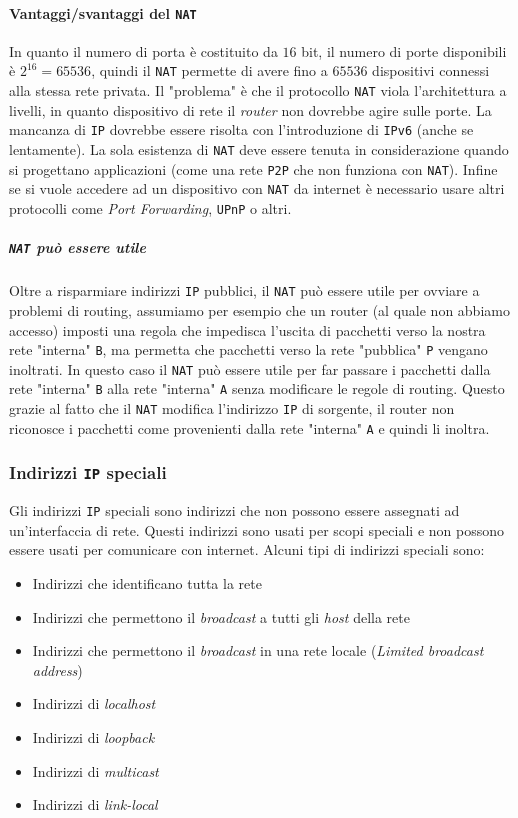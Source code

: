             \paragraph{Vantaggi/svantaggi del \texttt{NAT}} In quanto il numero di porta è costituito da $16$ bit, il numero di porte disponibili è $2^{16}=65536$, quindi il \texttt{NAT} permette di avere fino a $65536$ dispositivi connessi alla stessa rete privata. Il "problema" è che il protocollo \texttt{NAT} viola l'architettura a livelli, in quanto dispositivo di rete il \textit{router} non dovrebbe agire sulle porte. La mancanza di \texttt{IP} dovrebbe essere risolta con l'introduzione di \texttt{IPv6} (anche se lentamente). La sola esistenza di \texttt{NAT} deve essere tenuta in considerazione quando si progettano applicazioni (come una rete \texttt{P2P} che non funziona con \texttt{NAT}). Infine se si vuole accedere ad un dispositivo con \texttt{NAT} da internet è necessario usare altri protocolli come \textit{Port Forwarding}, \texttt{UPnP} o altri.
            \subparagraph{\texttt{NAT} può essere utile} Oltre a risparmiare indirizzi \texttt{IP} pubblici, il \texttt{NAT} può essere utile per ovviare a problemi di routing, assumiamo per esempio che un router (al quale non abbiamo accesso) imposti una regola che impedisca l'uscita di pacchetti verso la nostra rete "interna" \texttt{B}, ma permetta che pacchetti verso la rete "pubblica" \texttt{P} vengano inoltrati. In questo caso il \texttt{NAT} può essere utile per far passare i pacchetti dalla rete "interna" \texttt{B} alla rete "interna" \texttt{A} senza modificare le regole di routing. Questo grazie al fatto che il \texttt{NAT} modifica l'indirizzo \texttt{IP} di sorgente, il router non riconosce i pacchetti come provenienti dalla rete "interna" \texttt{A} e quindi li inoltra.
        \subsubsection{Indirizzi \texttt{IP} speciali}
            Gli indirizzi \texttt{IP} speciali sono indirizzi che non possono essere assegnati ad un'interfaccia di rete. Questi indirizzi sono usati per scopi speciali e non possono essere usati per comunicare con internet. Alcuni tipi di indirizzi speciali sono: \begin{itemize}
                \item Indirizzi che identificano tutta la rete
                \item Indirizzi che permettono il \textit{broadcast} a tutti gli \textit{host} della rete
                \item Indirizzi che permettono il \textit{broadcast} in una rete locale (\textit{Limited broadcast address})
                \item Indirizzi di \textit{localhost}
                \item Indirizzi di \textit{loopback}
                \item Indirizzi di \textit{multicast}
                \item Indirizzi di \textit{link-local}
            \end{itemize}
